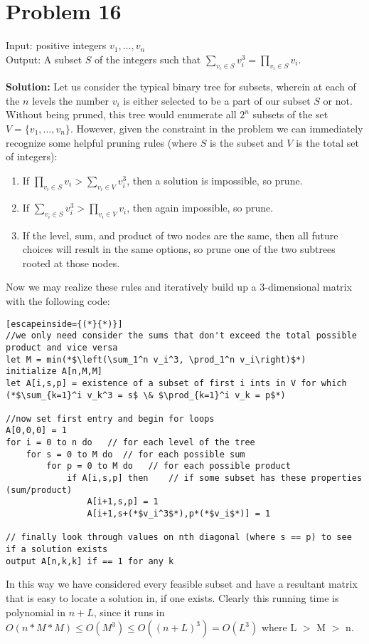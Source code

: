 \documentclass{article}
\providecommand{\prob}[1]{\section*{Problem #1}}
\providecommand{\soln}{\textbf{Solution: }}
\begin{document}
\prob{16}
Input: positive integers $v_1, \dots , v_n$\\
Output: A subset $S$ of the integers such that $\sum_{v_i \in S}v_i^3 = \prod_{v_i \in S}v_i$.\par \medskip
\soln
Let us consider the typical binary tree for subsets, wherein at each of the $n$ levels the number $v_i$ is either selected to be a part of our subset $S$ or not. Without being pruned, this tree would enumerate all $2^n$ subsets of the set $V = \{v_1,\dots,v_n\}$. However, given the constraint in the problem we can immediately recognize some helpful pruning rules (where $S$ is the subset and $V$ is the total set of integers):\par
\begin{enumerate}
    \item If $\prod_{v_i \in S}v_i > \sum_{v_i \in V}v_i^3$, then a solution is impossible, so prune.
    \item If $\sum_{v_i \in S}v_i^3 > \prod_{v_i \in V}v_i$, then again impossible, so prune.
    \item If the level, sum, and product of two nodes are the same, then all future choices will result in the same options, so prune one of the two subtrees rooted at those nodes.
\end{enumerate}
Now we may realize these rules and iteratively build up a 3-dimensional matrix with the following code:\par
\begin{lstlisting}[escapeinside={(*}{*)}]
//we only need consider the sums that don't exceed the total possible product and vice versa
let M = min(*$\left(\sum_1^n v_i^3, \prod_1^n v_i\right)$*)
initialize A[n,M,M]
let A[i,s,p] = existence of a subset of first i ints in V for which (*$\sum_{k=1}^i v_k^3 = s$ \& $\prod_{k=1}^i v_k = p$*)

//now set first entry and begin for loops
A[0,0,0] = 1
for i = 0 to n do   // for each level of the tree
    for s = 0 to M do  // for each possible sum
        for p = 0 to M do   // for each possible product
            if A[i,s,p] then    // if some subset has these properties (sum/product)
                A[i+1,s,p] = 1
                A[i+1,s+(*$v_i^3$*),p*(*$v_i$*)] = 1

// finally look through values on nth diagonal (where s == p) to see if a solution exists
output A[n,k,k] if == 1 for any k
\end{lstlisting}

In this way we have considered every feasible subset and have a resultant matrix that is easy to locate a solution in, if one exists. Clearly this running time is polynomial in $n + L$, since it runs in $O\left(n*M*M\right) \leq O\left(M^3\right) \leq O\left(\left(n+L\right)^3\right) = O\left(L^3\right)$ where L $>$ M $>$ n.
\end{document}

